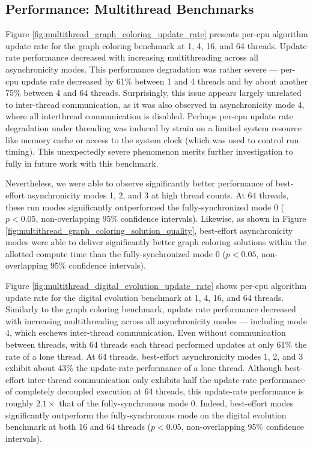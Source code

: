 \subsection{Performance: Multithread Benchmarks} \label{sec:multithread-benchmarks}



Figure \ref{fig:multithread_graph_coloring_update_rate} presents per-cpu algorithm update rate for the graph coloring benchmark at 1, 4, 16, and 64 threads.
Update rate performance decreased with increasing multithreading across all asynchronicity modes.
This performance degradation was rather severe --- per-cpu update rate decreased by 61\% between 1 and 4 threads and by about another 75\% between 4 and 64 threads.
Surprisingly, this issue appears largely unrelated to inter-thread communication, as it was also observed in asynchronicity mode 4, where all interthread communication is disabled.
Perhaps per-cpu update rate degradation under threading was induced by strain on a limited system resource like memory cache or access to the system clock (which was used to control run timing).
This unexpectedly severe phenomenon merits further investigation to fully in future work with this benchmark.

Nevertheless, we were able to observe significantly better performance of best-effort asynchronicity modes 1, 2, and 3 at high thread counts.
At 64 threads, these run modes significantly outperformed the fully-synchronized mode 0 ($p < 0.05$, non-overlapping 95\% confidence intervals).
Likewise, as shown in Figure \ref{fig:multithread_graph_coloring_solution_quality}, best-effort asynchronicity modes were able to deliver significantly better graph coloring solutions within the allotted compute time than the fully-synchronized mode 0 ($p < 0.05$, non-overlapping 95\% confidence intervals).

Figure \ref{fig:multithread_digital_evolution_update_rate} shows per-cpu algorithm update rate for the digital evolution benchmark at 1, 4, 16, and 64 threads.
Similarly to the graph coloring benchmark, update rate performance decreased with increasing multithreading across all asynchronicity modes --- including mode 4, which eschews inter-thread communication.
Even without communication between threads, with 64 threads each thread performed updates at only 61\% the rate of a lone thread.
At 64 threads, best-effort asynchronicity modes 1, 2, and 3 exhibit about 43\% the update-rate performance of a lone thread.
Although best-effort inter-thread communication only exhibits half the update-rate performance of completely decoupled execution at 64 threads, this update-rate performance is roughly $2.1\times$ that of the fully-synchronous mode 0.
Indeed, best-effort modes significantly outperform the fully-synchronous mode on the digital evolution benchmark at both 16 and 64 threads ($p < 0.05$, non-overlapping 95\% confidence intervals).
